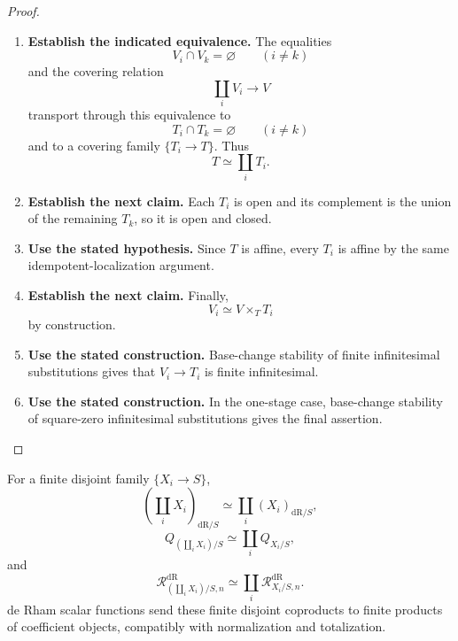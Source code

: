 \begin{proof}
\begin{enumerate}[label=\textup{(\arabic*)}]
    \[
    T_i\longrightarrow T.
    \]
    \item \textbf{Establish the indicated equivalence.}
    The equalities
    \[
    V_i\cap V_k=\varnothing
    \qquad(i\neq k)
    \]
    and the covering relation
    \[
    \coprod_iV_i\longrightarrow V
    \]
    transport through this equivalence to
    \[
    T_i\cap T_k=\varnothing
    \qquad(i\neq k)
    \]
    and to a covering family \(\{T_i\to T\}\).
    Thus
    \[
    T\simeq\coprod_iT_i.
    \]
    \item \textbf{Establish the next claim.}
    Each \(T_i\) is open and its complement is the union of the remaining \(T_k\), so it
    is open and closed.
    \item \textbf{Use the stated hypothesis.}
    Since \(T\) is affine, every \(T_i\) is affine by the same
    idempotent-localization argument.
    \item \textbf{Establish the next claim.}
    Finally,
    \[
    V_i\simeq V\times_TT_i
    \]
    by construction.
    \item \textbf{Use the stated construction.}
    Base-change stability of finite infinitesimal substitutions gives
    that \(V_i\to T_i\) is finite infinitesimal.
    \item \textbf{Use the stated construction.}
    In the one-stage case,
    base-change stability of square-zero infinitesimal substitutions gives the final
    assertion.
\end{enumerate}
\end{proof}

\begin{proposition}
\label{prop:finite-coproduct-compatibility}
For a finite disjoint family \(\{X_i\to S\}\),
\[
  \left(\coprod_iX_i\right)_{\mathrm{dR}/S}
  \simeq
  \coprod_i(X_i)_{\mathrm{dR}/S},
\]
\[
  Q_{(\coprod_iX_i)/S}
  \simeq
  \coprod_iQ_{X_i/S},
\]
and
\[
  \mathcal R^{\mathrm{dR}}_{(\coprod_iX_i)/S,n}
  \simeq
  \coprod_i\mathcal R^{\mathrm{dR}}_{X_i/S,n}.
\]
de Rham scalar functions send these finite disjoint coproducts to finite products of
coefficient objects, compatibly with normalization and totalization.
\end{proposition}

